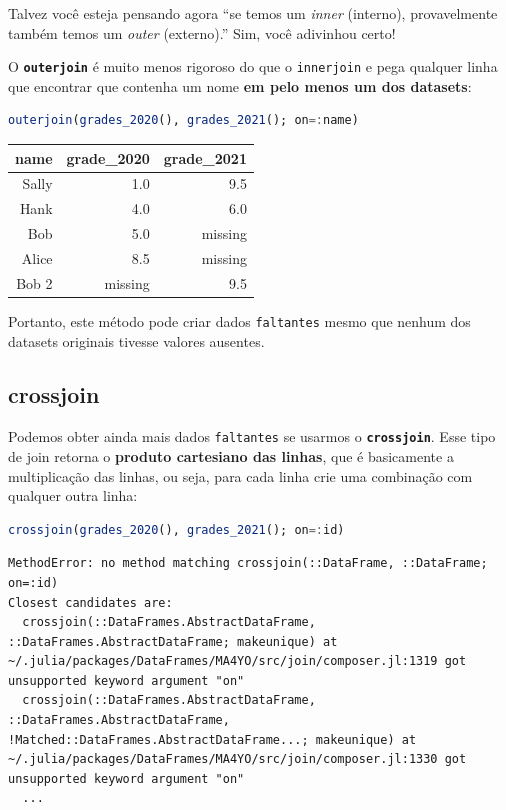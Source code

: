 \documentclass[
  notoc %
]{tufte-book}
\newcommand{\passthrough}[1]{#1}
\begin{document}
Talvez você esteja pensando agora ``se temos um \emph{inner} (interno),
provavelmente também temos um \emph{outer} (externo).'' Sim, você
adivinhou certo!

O \textbf{\passthrough{\lstinline!outerjoin!}} é muito menos rigoroso do
que o \passthrough{\lstinline!innerjoin!} e pega qualquer linha que
encontrar que contenha um nome \textbf{em pelo menos um dos datasets}:

\begin{lstlisting}[language=Julia]
outerjoin(grades_2020(), grades_2021(); on=:name)
\end{lstlisting}

\begin{longtable}[]{@{}rrr@{}}
\toprule
name & grade\_2020 & grade\_2021 \\
\midrule
\endhead
Sally & 1.0 & 9.5 \\
Hank & 4.0 & 6.0 \\
Bob & 5.0 & missing \\
Alice & 8.5 & missing \\
Bob 2 & missing & 9.5 \\
\bottomrule
\end{longtable}

Portanto, este método pode criar dados
\passthrough{\lstinline!faltantes!} mesmo que nenhum dos datasets
originais tivesse valores ausentes.

\hypertarget{sec:crossjoin}{%
\subsection{crossjoin}\label{sec:crossjoin}}

Podemos obter ainda mais dados \passthrough{\lstinline!faltantes!} se
usarmos o \textbf{\passthrough{\lstinline!crossjoin!}}. Esse tipo de
join retorna o \textbf{produto cartesiano das linhas}, que é basicamente
a multiplicação das linhas, ou seja, para cada linha crie uma combinação
com qualquer outra linha:

\begin{lstlisting}[language=Julia]
crossjoin(grades_2020(), grades_2021(); on=:id)
\end{lstlisting}

\begin{lstlisting}[language=Output]
MethodError: no method matching crossjoin(::DataFrame, ::DataFrame; on=:id)
Closest candidates are:
  crossjoin(::DataFrames.AbstractDataFrame, ::DataFrames.AbstractDataFrame; makeunique) at ~/.julia/packages/DataFrames/MA4YO/src/join/composer.jl:1319 got unsupported keyword argument "on"
  crossjoin(::DataFrames.AbstractDataFrame, ::DataFrames.AbstractDataFrame, !Matched::DataFrames.AbstractDataFrame...; makeunique) at ~/.julia/packages/DataFrames/MA4YO/src/join/composer.jl:1330 got unsupported keyword argument "on"
  ...
\end{lstlisting}
\end{document}
